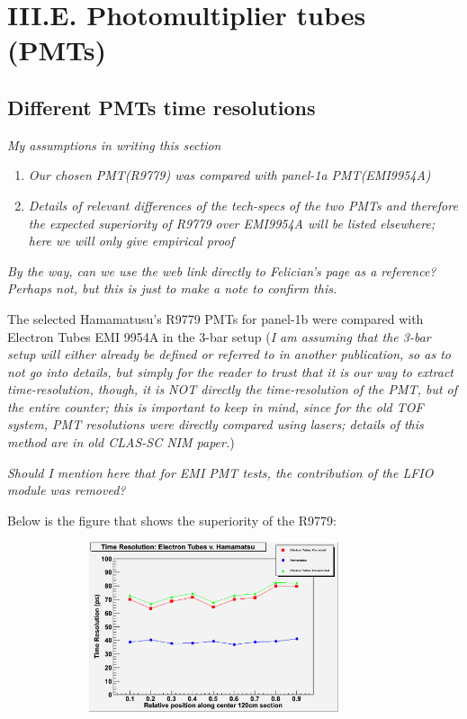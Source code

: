 \documentclass[12pt]{article}
\begin{document}
\maketitle


\section{III.E. Photomultiplier tubes (PMTs)}

\subsection{Different PMTs time resolutions}
\textit{My assumptions in writing this section}
\begin{enumerate}
	\item \textit{Our chosen PMT(R9779) was compared with panel-1a PMT(EMI9954A)}
	\item \textit {Details of relevant differences of the tech-specs of the two PMTs and therefore the expected superiority of R9779 over EMI9954A will be listed elsewhere; here we will only give empirical proof}
\end{enumerate}

\textit{By the way, can we use the web link directly to Felician's page as a reference? Perhaps not, but this is just to make a note to confirm this.}

The selected Hamamatusu's R9779 PMTs for panel-1b were compared with Electron Tubes EMI 9954A in the 3-bar setup (\textit{I am assuming that the 3-bar setup will either already be defined or referred to in another publication, so as to not go into details, but simply for the reader to trust that it is our way to extract time-resolution, though, it is NOT directly the time-resolution of the PMT, but of the entire counter; this is important to keep in mind, since for the old TOF system, PMT resolutions were directly compared using lasers; details of this method are in old CLAS-SC NIM paper.})

\textit{Should I mention here that for EMI PMT tests, the contribution of the LFIO module was removed?}

\newpage
Below is the figure that shows the superiority of the R9779:
\begin{figure}[th]
	\includegraphics[width=10cm, height=5cm]{PMTcomparison.eps}
\end{figure}
\end{document}
